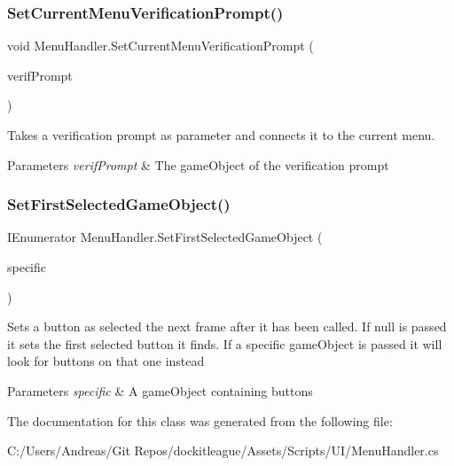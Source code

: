 \hypertarget{class_menu_handler_a9273b435b2f88cd308fc1bd8120f733d}{}\label{class_menu_handler_a9273b435b2f88cd308fc1bd8120f733d} 
\subsubsection{\texorpdfstring{Set\+Current\+Menu\+Verification\+Prompt()}{SetCurrentMenuVerificationPrompt()}}
{\footnotesize\ttfamily void Menu\+Handler.\+Set\+Current\+Menu\+Verification\+Prompt (\begin{DoxyParamCaption}\item[{Game\+Object}]{verif\+Prompt }\end{DoxyParamCaption})}



Takes a verification prompt as parameter and connects it to the current menu. 


\begin{DoxyParams}{Parameters}
{\em verif\+Prompt} & The game\+Object of the verification prompt\\
\hline
\end{DoxyParams}
\hypertarget{class_menu_handler_a9a847d363279e4b969a3584ee4134e50}{}\label{class_menu_handler_a9a847d363279e4b969a3584ee4134e50} 
\subsubsection{\texorpdfstring{Set\+First\+Selected\+Game\+Object()}{SetFirstSelectedGameObject()}}
{\footnotesize\ttfamily I\+Enumerator Menu\+Handler.\+Set\+First\+Selected\+Game\+Object (\begin{DoxyParamCaption}\item[{Game\+Object}]{specific }\end{DoxyParamCaption})}



Sets a button as selected the next frame after it has been called. If null is passed it sets the first selected button it finds. If a specific game\+Object is passed it will look for buttons on that one instead 


\begin{DoxyParams}{Parameters}
{\em specific} & A game\+Object containing buttons\\
\hline
\end{DoxyParams}


The documentation for this class was generated from the following file\+:\begin{DoxyCompactItemize}
\item 
C\+:/\+Users/\+Andreas/\+Git Repos/dockitleague/\+Assets/\+Scripts/\+U\+I/Menu\+Handler.\+cs\end{DoxyCompactItemize}
